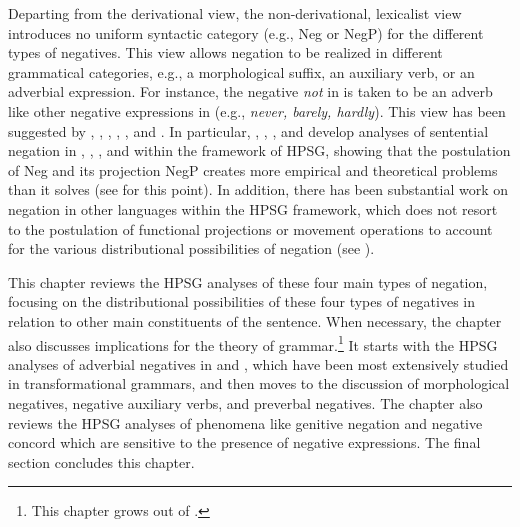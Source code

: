 \documentclass[output=paper
	        ,collection
	        ,collectionchapter
 	        ,biblatex
                ,babelshorthands
                ,newtxmath
                ,draftmode
                ,colorlinks, citecolor=brown
]{langscibook}
\begin{document}
Departing from the derivational view, the non-derivational, lexicalist view
introduces no uniform syntactic category (e.g., Neg or NegP) for the different types of negatives. This view allows negation to be realized in different grammatical categories, e.g., a morphological suffix, an auxiliary verb, or an adverbial expression. For instance, the negative \emph{not} in  is taken to be an adverb like other negative expressions in  (e.g., \textit{never, barely, hardly}). This view has been suggested by \citet{Jackendoff:72}, \citet{Baker:91}, \citet{Ernst:92}, \citet{AG:97}, \citet{Kim:00}, and \citet{Warner2000a-u}. In particular,
\citet{KS:96}, \citet{AG:97}, \citet{Kim:00}, and \citet{KS:02} develop analyses of sentential negation in , , , and  within the framework of HPSG, showing that the postulation of Neg and its projection NegP creates more empirical and theoretical problems than it solves (see \citealt{Newmeyer:2006} for this point).
In addition, there has been substantial work on negation in other languages within the HPSG framework, which
does not resort to the postulation of functional projections or movement operations to account for the various distributional possibilities
of negation (see \citealt{PK:99, BJ:00, Prz:00, Kupsc:02, Swart:02, Borsley:05, Crysmann:10, Bender:13}).

This chapter reviews the HPSG analyses of these four main types of negation,
focusing on the distributional possibilities of these four types of negatives in
relation to other main constituents of the sentence. When
necessary, the chapter also discusses implications for
the theory of grammar.\footnote{This chapter grows out of \citet{Kim:00,kim:18}.}
It starts with the HPSG analyses of adverbial negatives in  and , which have been most extensively studied in transformational grammars,
and then moves to the discussion of morphological
negatives, negative auxiliary verbs, and preverbal negatives. The chapter
also reviews the HPSG analyses of phenomena like genitive negation and
negative concord which are sensitive to the presence of negative expressions. The
final section concludes this chapter.
\end{document}
